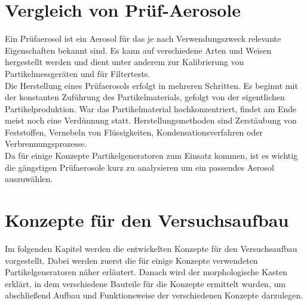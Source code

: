 \chapter{Vergleich von Pr\"{u}f-Aerosole}\label{ch:aerosol}
Ein Pr\"{u}faerosol ist ein Aerosol f\"{u}r das je nach Verwendungszweck relevante Eigenschaften bekannt sind. Es kann auf verschiedene Arten und Weisen hergestellt werden und dient unter anderem zur Kalibrierung von Partikelmessger\"{a}ten und f\"{u}r Filtertests.\\
Die Herstellung eines Pr\"{u}faerosols erfolgt in mehreren Schritten. Es beginnt mit der konstanten Zuf\"{u}hrung des Partikelmaterials, gefolgt von der eigentlichen Partikelproduktion. War das Partikelmaterial hochkonzentriert, findet am Ende meist noch eine Verd\"{u}nnung statt. Herstellungsmethoden sind Zerst\"{a}ubung von Feststoffen, Vernebeln von Fl\"{u}ssigkeiten, Kondensationsverfahren oder Verbrennungsprozesse.\\
Da f\"{u}r einige Konzepte Partikelgeneratoren zum Einsatz kommen, ist es wichtig die g\"{a}ngstigen Pr\"{u}faerosole kurz zu analysieren um ein passendes Aerosol auszuw\"{a}hlen.



\newpage



\newpage


\chapter{Konzepte f\"{u}r den Versuchsaufbau}\label{ch:concepts}
Im folgenden Kapitel werden die entwickelten Konzepte f\"{u}r den Versuchsaufbau vorgestellt. Dabei werden zuerst die f\"{u}r einige Konzepte verwendeten Partikelgeneratoren n\"{a}her erl\"{a}utert. Danach wird der morphologische Kasten erkl\"{a}rt, in dem verschiedene Bauteile f\"{u}r die Konzepte ermittelt wurden, um abschlie{\ss}end Aufbau und Funktionsweise der verschiedenen Konzepte darzulegen.



\newpage





